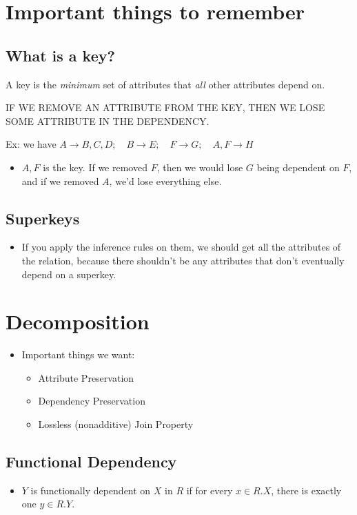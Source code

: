\documentclass[11pt]{article}
\author{Julian Eng}
\date{\today}
\title{}
\begin{document}
\tableofcontents

\section{Important things to remember}
\label{sec:orgaa226f5}
\subsection{What is a key?}
\label{sec:org31faaa5}
A key is the \emph{minimum} set of attributes that \emph{all} other attributes depend
on.

IF WE REMOVE AN ATTRIBUTE FROM THE KEY, THEN WE LOSE SOME ATTRIBUTE IN THE
DEPENDENCY.

Ex: we have \(A \to B, C, D; \quad B \to E;\quad F \to G;\quad A, F \to H\)
\begin{itemize}
\item \(A, F\) is the key. If we removed \(F\), then we would lose \(G\) being
dependent on \(F\), and if we removed \(A\), we'd lose everything else.
\end{itemize}

\subsection{Superkeys}
\label{sec:org69e2255}
\begin{itemize}
\item If you apply the inference rules on them, we should get all the attributes
of the relation, because there shouldn't be any attributes that don't
eventually depend on a superkey.
\end{itemize}

\section{Decomposition}
\label{sec:org93773c0}
\begin{itemize}
\item Important things we want:
\begin{itemize}
\item Attribute Preservation
\item Dependency Preservation
\item Lossless (nonadditive) Join Property
\end{itemize}
\end{itemize}

\subsection{Functional Dependency}
\label{sec:org541d419}
\begin{itemize}
\item \(Y\) is functionally dependent on \(X\) in \(R\) if for every \(x \in R.X\), there
is exactly one \(y \in R.Y\).
\end{itemize}
\end{document}
